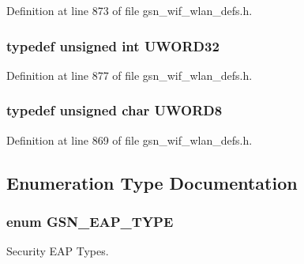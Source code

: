 Definition at line 873 of file gsn\_\-wif\_\-wlan\_\-defs.h.

\hypertarget{a00677_gad0599cef3ddc489e9b2fe8afc3159f12}{
\subsubsection[{UWORD32}]{\setlength{\rightskip}{0pt plus 5cm}typedef unsigned int {\bf UWORD32}}}
\label{a00677_gad0599cef3ddc489e9b2fe8afc3159f12}


Definition at line 877 of file gsn\_\-wif\_\-wlan\_\-defs.h.

\hypertarget{a00677_gad4e70fe7a239280a211703cce48b43da}{
\subsubsection[{UWORD8}]{\setlength{\rightskip}{0pt plus 5cm}typedef unsigned char {\bf UWORD8}}}
\label{a00677_gad4e70fe7a239280a211703cce48b43da}


Definition at line 869 of file gsn\_\-wif\_\-wlan\_\-defs.h.



\subsection{Enumeration Type Documentation}
\hypertarget{a00677_ga95dd88b436cd52a999dda3865de87fe3}{
\subsubsection[{GSN\_\-EAP\_\-TYPE}]{\setlength{\rightskip}{0pt plus 5cm}enum {\bf GSN\_\-EAP\_\-TYPE}}}
\label{a00677_ga95dd88b436cd52a999dda3865de87fe3}


Security EAP Types. 

